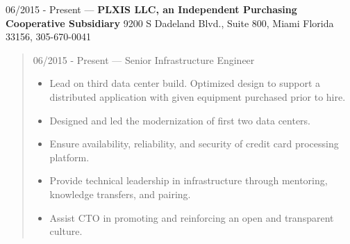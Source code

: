 06/2015 - Present --- {\bf PLXIS LLC, an Independent Purchasing Cooperative Subsidiary} 9200 S Dadeland Blvd., Suite 800, Miami Florida 33156, 305-670-0041
\begin{quote}
06/2015 - Present --- Senior Infrastructure Engineer
\begin{itemize}
\item Lead on third data center build.  Optimized design to support a distributed application with given equipment purchased prior to hire.
\item Designed and led the modernization of first two data centers.
\item Ensure availability, reliability, and security of credit card processing platform.
\item Provide technical leadership in infrastructure through mentoring, knowledge transfers, and pairing.
\item Assist CTO in promoting and reinforcing an open and transparent culture.
\end{itemize}
\end{quote}
